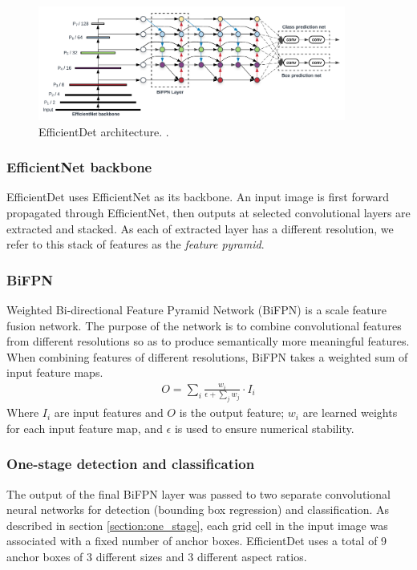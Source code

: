 \documentclass[12pt,a4paper,twoside,openany]{report}
\begin{document}
\begin{figure}[h]
    \centering
    \includegraphics[width=0.9\textwidth]{figs/implementation/efficientdetarch.png}
    \caption{EfficientDet architecture. \cite{tan_efficientdet_2020}.}
    \label{fig:efficientdetarch}
\end{figure}

\subsubsection{EfficientNet backbone}
EfficientDet uses EfficientNet \cite{tan_efficientnet_2020} as its backbone. An input image is first forward propagated through EfficientNet, then outputs at selected convolutional layers are extracted and stacked. As each of extracted layer has a different resolution, we refer to this stack of features as the \textit{feature pyramid}. 

\subsubsection{BiFPN}
Weighted Bi-directional Feature Pyramid Network (BiFPN) is a scale feature fusion network. The purpose of the network is to combine convolutional features from different resolutions so as to produce semantically more meaningful features. When combining features of different resolutions, BiFPN takes a weighted sum of input feature maps.
\begin{align}
    O=\sum_i \frac{w_i}{\epsilon + \sum_j w_j}\cdot I_i
\end{align}
Where $I_i$ are input features and $O$ is the output feature; $w_i$ are learned weights for each input feature map, and $\epsilon$ is used to ensure numerical stability.

\subsubsection{One-stage detection and classification}
The output of the final BiFPN layer was passed to two separate convolutional neural networks for detection (bounding box regression) and classification. As described in section \ref{section:one_stage}, each grid cell in the input image was associated with a fixed number of anchor boxes. EfficientDet uses a total of 9 anchor boxes of 3 different sizes and 3 different aspect ratios.  
\end{document}
